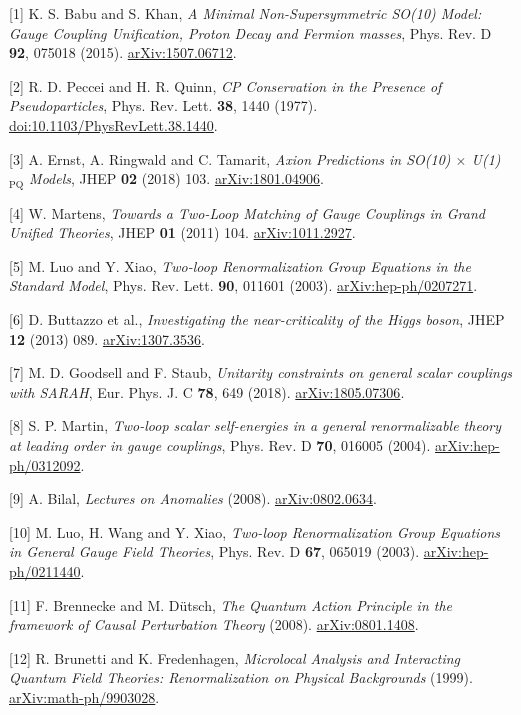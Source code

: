 \documentclass[10pt,letterpaper]{article}
\newcommand{\PQ}{\mathrm{PQ}}
\newcommand{\sect}[1]{\vspace{5pt}{\large\bfseries\color{ink}#1}\par}
\begin{document}
\sect{References}
{\small\setlength{\parskip}{3pt}
[1] K. S. Babu and S. Khan, \emph{A Minimal Non-Supersymmetric SO(10) Model:
Gauge Coupling Unification, Proton Decay and Fermion masses},
Phys. Rev. D \textbf{92}, 075018 (2015).
\href{https://arxiv.org/abs/1507.06712}{arXiv:1507.06712}.

[2] R. D. Peccei and H. R. Quinn, \emph{CP Conservation in the Presence of
Pseudoparticles}, Phys. Rev. Lett. \textbf{38}, 1440 (1977).
\href{https://doi.org/10.1103/PhysRevLett.38.1440}{doi:10.1103/PhysRevLett.38.1440}.

[3] A. Ernst, A. Ringwald and C. Tamarit, \emph{Axion Predictions in
SO(10) $\times$ U(1)$_{\PQ}$ Models}, JHEP \textbf{02} (2018) 103.
\newline\href{https://arxiv.org/abs/1801.04906}{arXiv:1801.04906}.

[4] W. Martens, \emph{Towards a Two-Loop Matching of Gauge Couplings in
Grand Unified Theories}, JHEP \textbf{01} (2011) 104.
\href{https://arxiv.org/abs/1011.2927}{arXiv:1011.2927}.

[5] M. Luo and Y. Xiao, \emph{Two-loop Renormalization Group Equations in
the Standard Model}, Phys. Rev. Lett. \textbf{90}, 011601 (2003).
\href{https://arxiv.org/abs/hep-ph/0207271}{arXiv:hep-ph/0207271}.

[6] D. Buttazzo et al., \emph{Investigating the near-criticality of the Higgs
boson}, JHEP \textbf{12} (2013) 089.
\href{https://arxiv.org/abs/1307.3536}{arXiv:1307.3536}.

[7] M. D. Goodsell and F. Staub, \emph{Unitarity constraints on general scalar
couplings with SARAH}, Eur. Phys. J. C \textbf{78}, 649 (2018).
\href{https://arxiv.org/abs/1805.07306}{arXiv:1805.07306}.

[8] S. P. Martin, \emph{Two-loop scalar self-energies in a general
renormalizable theory at leading order in gauge couplings}, Phys. Rev. D
\textbf{70}, 016005 (2004).
\href{https://arxiv.org/abs/hep-ph/0312092}{arXiv:hep-ph/0312092}.

[9] A. Bilal, \emph{Lectures on Anomalies} (2008).
\href{https://arxiv.org/abs/0802.0634}{arXiv:0802.0634}.

[10] M. Luo, H. Wang and Y. Xiao, \emph{Two-loop Renormalization Group
Equations in General Gauge Field Theories}, Phys. Rev. D \textbf{67},
065019 (2003). \href{https://arxiv.org/abs/hep-ph/0211440}{arXiv:hep-ph/0211440}.

[11] F. Brennecke and M. D\"utsch, \emph{The Quantum Action Principle in the
framework of Causal Perturbation Theory} (2008).
\href{https://arxiv.org/abs/0801.1408}{arXiv:0801.1408}.

[12] R. Brunetti and K. Fredenhagen, \emph{Microlocal Analysis and Interacting
Quantum Field Theories: Renormalization on Physical Backgrounds} (1999).
\href{https://arxiv.org/abs/math-ph/9903028}{arXiv:math-ph/9903028}.

}
\end{document}
